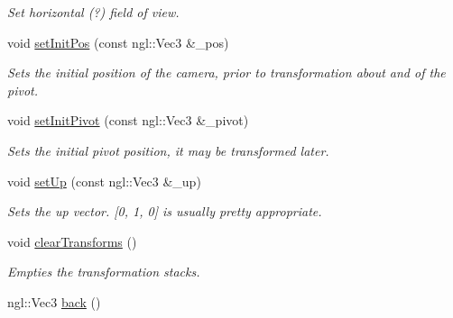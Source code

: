 \begin{DoxyCompactItemize}
\begin{DoxyCompactList}\small\item\em Set horizontal (?) field of view. \end{DoxyCompactList}\item 
\hypertarget{class_camera_ab01e773741fc2c3b5ecce4f8cf8e1cd2}{}void \hyperlink{class_camera_ab01e773741fc2c3b5ecce4f8cf8e1cd2}{set\+Init\+Pos} (const ngl\+::\+Vec3 \&\+\_\+pos)\label{class_camera_ab01e773741fc2c3b5ecce4f8cf8e1cd2}

\begin{DoxyCompactList}\small\item\em Sets the initial position of the camera, prior to transformation about and of the pivot. \end{DoxyCompactList}\item 
\hypertarget{class_camera_a15a53caa69de3870947178a0314a930b}{}void \hyperlink{class_camera_a15a53caa69de3870947178a0314a930b}{set\+Init\+Pivot} (const ngl\+::\+Vec3 \&\+\_\+pivot)\label{class_camera_a15a53caa69de3870947178a0314a930b}

\begin{DoxyCompactList}\small\item\em Sets the initial pivot position, it may be transformed later. \end{DoxyCompactList}\item 
\hypertarget{class_camera_aae445f6ca8819afc09bd955afa24d0c3}{}void \hyperlink{class_camera_aae445f6ca8819afc09bd955afa24d0c3}{set\+Up} (const ngl\+::\+Vec3 \&\+\_\+up)\label{class_camera_aae445f6ca8819afc09bd955afa24d0c3}

\begin{DoxyCompactList}\small\item\em Sets the up vector. \mbox{[}0, 1, 0\mbox{]} is usually pretty appropriate. \end{DoxyCompactList}\item 
\hypertarget{class_camera_a52609a8b218a9c12b84e839633b990cf}{}void \hyperlink{class_camera_a52609a8b218a9c12b84e839633b990cf}{clear\+Transforms} ()\label{class_camera_a52609a8b218a9c12b84e839633b990cf}

\begin{DoxyCompactList}\small\item\em Empties the transformation stacks. \end{DoxyCompactList}\item 
\hypertarget{class_camera_ae965ddddc3a83ba2d37d84d6fee413f7}{}ngl\+::\+Vec3 \hyperlink{class_camera_ae965ddddc3a83ba2d37d84d6fee413f7}{back} ()\label{class_camera_ae965ddddc3a83ba2d37d84d6fee413f7}


\end{DoxyCompactItemize}
